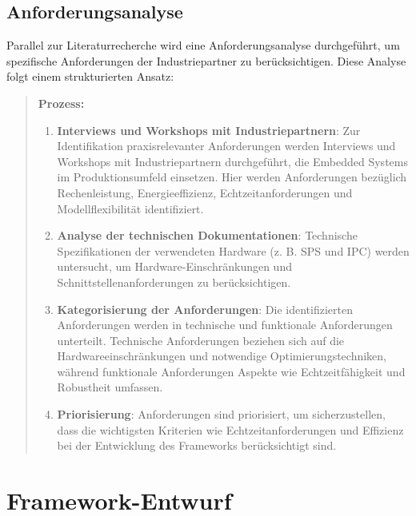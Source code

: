 \subsection{Anforderungsanalyse}

Parallel zur Literaturrecherche wird eine Anforderungsanalyse durchgeführt, um spezifische Anforderungen der Industriepartner zu berücksichtigen. Diese Analyse folgt einem strukturierten Ansatz:
\begin{quote}
\textbf{Prozess:}
\begin{enumerate}
\item \textbf{Interviews und Workshops mit Industriepartnern}: Zur Identifikation praxisrelevanter Anforderungen werden Interviews und Workshops mit Industriepartnern durchgeführt, die Embedded Systems im Produktionsumfeld einsetzen. Hier werden Anforderungen bezüglich Rechenleistung, Energieeffizienz, Echtzeitanforderungen und Modellflexibilität identifiziert.
\item \textbf{Analyse der technischen Dokumentationen}: Technische Spezifikationen der verwendeten Hardware (z. B. SPS und IPC) werden untersucht, um Hardware-Einschränkungen und Schnittstellenanforderungen zu berücksichtigen.
\item \textbf{Kategorisierung der Anforderungen}: Die identifizierten Anforderungen werden in technische und funktionale Anforderungen unterteilt. Technische Anforderungen beziehen sich auf die Hardwareeinschränkungen und notwendige Optimierungstechniken, während funktionale Anforderungen Aspekte wie Echtzeitfähigkeit und Robustheit umfassen.
\item \textbf{Priorisierung}: Anforderungen sind priorisiert, um sicherzustellen, dass die wichtigsten Kriterien wie Echtzeitanforderungen und Effizienz bei der Entwicklung des Frameworks berücksichtigt sind.
\end{enumerate}
\end{quote}

\section{Framework-Entwurf}

